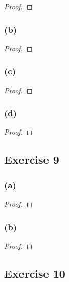 \documentclass[14pt]{extarticle}
\begin{document}
\begin{proof}

\end{proof}

\subsubsection{(b)}

\begin{proof}

\end{proof}

\subsubsection{(c)}

\begin{proof}

\end{proof}

\subsubsection{(d)}

\begin{proof}

\end{proof}

\subsection{Exercise 9}

\subsubsection{(a)}

\begin{proof}

\end{proof}

\subsubsection{(b)}

\begin{proof}

\end{proof}

\subsection{Exercise 10}
\end{document}
